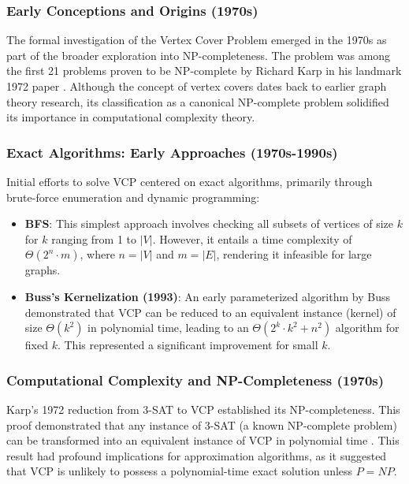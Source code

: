 \documentclass[acmsmall]{acmart}
\begin{document}
	\subsubsection{Early Conceptions and Origins (1970s)}
	
	\hspace{1.2em}The formal investigation of the Vertex Cover Problem emerged in the 1970s as part of the broader exploration into NP-completeness. The problem was among the first 21 problems proven to be NP-complete by Richard Karp in his landmark 1972 paper\cite{karp1972reducibility} . Although the concept of vertex covers dates back to earlier graph theory research, its classification as a canonical NP-complete problem solidified its importance in computational complexity theory.
	
	\subsubsection{Exact Algorithms: Early Approaches (1970s-1990s)}
	\hspace{1.2em}Initial efforts to solve VCP centered on exact algorithms, primarily through brute-force enumeration and dynamic programming:
	\begin{itemize}
		\item \textbf{BFS}: This simplest approach involves checking all subsets of vertices of size \( k \) for \( k \) ranging from 1 to \( |V| \). However, it entails a time complexity of \( \Theta(2^n \cdot m) \), where \( n = |V| \) and \( m = |E| \), rendering it infeasible for large graphs.
		
		\item \textbf{Buss's Kernelization (1993)}: An early parameterized algorithm by Buss\cite{Josep2006Kernels} demonstrated that VCP can be reduced to an equivalent instance (kernel) of size \( \Theta(k^2) \) in polynomial time, leading to an \( \Theta(2^k \cdot k^2 + n^2) \) algorithm for fixed \( k \). This represented a significant improvement for small \( k \).
	\end{itemize}
	
	\subsubsection{Computational Complexity and NP-Completeness (1970s)}
	\hspace{1.2em}Karp's 1972 reduction from 3-SAT to VCP established its NP-completeness. This proof demonstrated that any instance of 3-SAT (a known NP-complete problem) can be transformed into an equivalent instance of VCP in polynomial time\cite{karp1972reducibility} . This result had profound implications for approximation algorithms, as it suggested that VCP is unlikely to possess a polynomial-time exact solution unless \( P = NP \).
	
\end{document}
